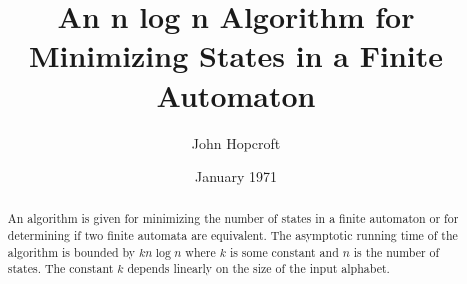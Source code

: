\documentclass[dvipdfm,a4paper]{article}
\title{An n log n Algorithm for Minimizing States in a Finite Automaton}
\author{John Hopcroft}
\date{January 1971}
\begin{document}
\pagestyle{headings}
\maketitle

\begin{abstract}
An algorithm is given for minimizing the number of states in a finite automaton or for
determining if two finite automata are equivalent. The asymptotic running time of the
algorithm is bounded by $k n \log n$ where $k$ is some constant and $n$ is the number of
states. The constant $k$ depends linearly on the size of the input alphabet.
\end{abstract}

\tableofcontents






\end{document}
